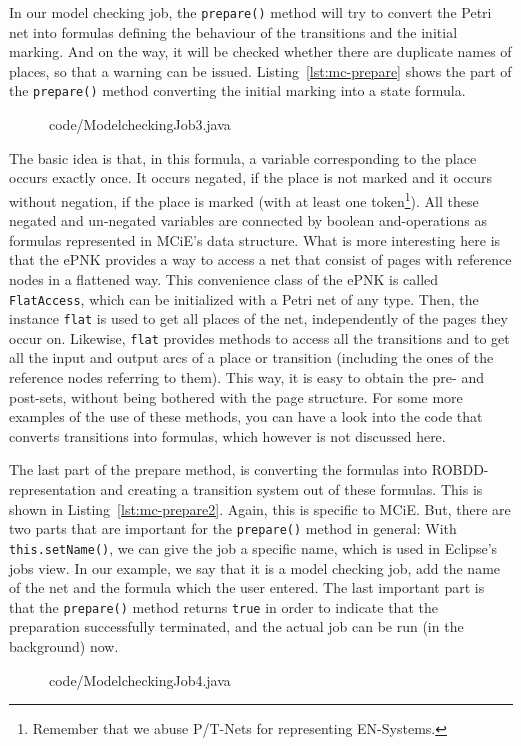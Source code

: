 \begin{description}
    In our model checking job, the {\tt prepare()} method will try to convert
    the Petri net into formulas defining the behaviour of the transitions
    and the initial marking. And on the way, it will be checked whether there
    are duplicate names of places, so that a warning can be issued.   
    Listing~\ref{lst:mc-prepare} shows the part of the {\tt prepare()} method
    converting the initial marking into a state formula.
\begin{figure}[tbp!] %
%
{code/ModelcheckingJob3.java}
\end{figure}
    The basic idea is that, in this formula, a variable corresponding to the
    place occurs exactly once. It occurs negated, if the place is not marked
    and it occurs without negation, if the place is marked (with at least one
    token\footnote
      {Remember that we abuse P/T-Nets for representing EN-Systems.}). 
    All these negated and un-negated variables are connected by boolean
    and-operations as formulas represented in MCiE's data structure.
    What is more interesting here is that the ePNK provides a way to access a net
    that consist of pages with reference nodes in a flattened way. This
    convenience class of the ePNK is called {\tt FlatAccess},%
    which can be initialized with a Petri net of any type. Then, the instance
    {\tt flat} is used to get all places of the net, independently of the 
    pages they occur on. Likewise,
    {\tt flat} provides methods to access all the transitions and to get all
    the input and output arcs of a place or transition (including the ones of
    the reference nodes referring to them). This way, it is easy to obtain the
    pre- and post-sets, without being bothered with the page structure. For some
    more examples of the use of these methods, you can have a look into the
    code that converts transitions into formulas, which however is not
    discussed here.
    
    The last part of the prepare method, is converting the formulas into
    ROBDD-representation and creating a transition system out of these formulas.
    This is shown in Listing~\ref{lst:mc-prepare2}.
    Again, this is specific to MCiE. But, there are two parts that are
    important for the {\tt prepare()} method in general: With {\tt 
    this.setName()}, we can give the job a specific name, which is used in
    Eclipse's jobs view. In our example, we say that it is a model checking job,
    add the name of the net and the formula which the user entered. The last
    important part is that the  {\tt prepare()} method returns {\tt true} in order to
    indicate that the preparation successfully terminated, and the actual
    job can be run (in the background) now.
\begin{figure}[htbp!]
%
{code/ModelcheckingJob4.java}
\end{figure}


\end{description}
